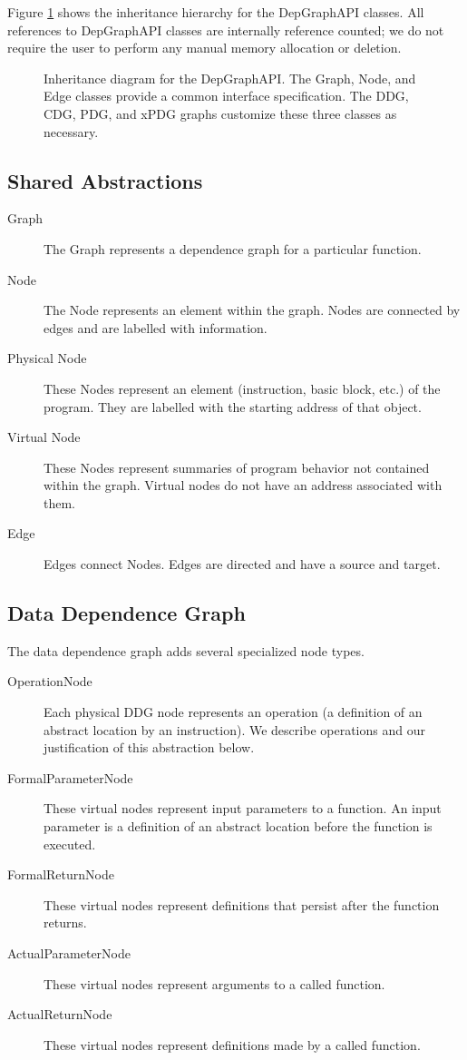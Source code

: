 \documentclass[12pt,titlepage]{article}
\begin{document}
Figure \ref{inheritance} shows the
inheritance hierarchy for the DepGraphAPI classes. All references to
DepGraphAPI classes are internally reference counted; we do not
require the user to perform any manual memory allocation or deletion.

\begin{figure}
\begin{center}
\caption{Inheritance diagram for the DepGraphAPI. The Graph, Node, and
  Edge classes provide a common interface specification. The DDG, CDG,
  PDG, and xPDG graphs customize these three classes as necessary.}
\end{center}
\label{inheritance}
\end{figure}

\subsection{Shared Abstractions}

\begin{description}
\item[Graph] The Graph represents a dependence graph for a particular
function.
\item[Node] The Node represents an element within the graph. Nodes are
connected by edges and are labelled with information.
\item[Physical Node] These Nodes represent an element (instruction, basic
block, etc.) of the program. They are labelled with the starting address
of that object.
\item[Virtual Node] These Nodes represent summaries of program
behavior not contained within the graph. Virtual nodes do not have an
address associated with them.
\item[Edge] Edges connect Nodes. Edges are directed and have a source
and target.
\end{description}

\subsection{Data Dependence Graph}

The data dependence graph adds several specialized node types.

\begin{description}
\item[OperationNode] Each physical
DDG node represents an operation (a definition of an abstract location
by an instruction). We describe operations and our justification of
this abstraction below.  
\item[FormalParameterNode] These virtual nodes
represent input parameters to a function. An input parameter is a
definition of an abstract location before the function is executed.
\item[FormalReturnNode] These virtual nodes represent definitions that
persist after the function returns.  
\item[ActualParameterNode] These
virtual nodes represent arguments to a called function.
\item[ActualReturnNode] These virtual nodes represent definitions made by a
called function. 
\end{description}
\end{document}
